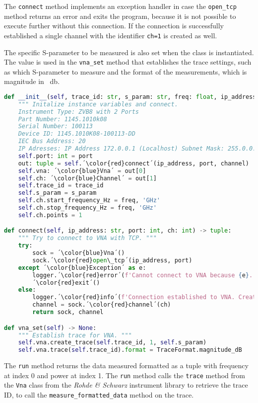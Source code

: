 The \verb+connect+ method implements an exception handler in case the \verb+open_tcp+ method returns an error and exits the program, because it is not possible to execute further without this connection. If the connection is successfully established a single channel with the identifier \verb+ch=1+ is created as well. 

The specific S-parameter to be measured is also set when the class is instantiated. The value is used in the \verb+vna_set+ method that establishes the trace settings, such as which S-parameter to measure and the format of the measurements, which is magnitude in \SI{}{\decibel}.

\begin{lstlisting}[language=Python, caption=Method for initialisation of VNA settings including creating VNA trace.]
def __init__(self, trace_id: str, s_param: str, freq: float, ip_address = '172.0.0.1', port: int = 5025, channel = 1) -> None:
    """ Initalize instance variables and connect.
    Instrument Type: ZVB8 with 2 Ports
    Part Number: 1145.1010k08
    Serial Number: 100113
    Device ID: 1145.1010K08-100113-DD
    IEC Bus Address: 20
    IP Adresses: IP Address 172.0.0.1 (Localhost) Subnet Mask: 255.0.0.0 """
    self.port: int = port
    out: tuple = self.´\color{red}connect´(ip_address, port, channel)
    self.vna: ´\color{blue}Vna´ = out[0]
    self.ch: ´\color{blue}Channel´ = out[1]
    self.trace_id = trace_id
    self.s_param = s_param
    self.ch.start_frequency_Hz = freq, 'GHz'
    self.ch.stop_frequency_Hz = freq, 'GHz'
    self.ch.points = 1

def connect(self, ip_address: str, port: int, ch: int) -> tuple:
    """ Try to connect to VNA with TCP. """
    try:
        sock = ´\color{blue}Vna´()
        sock.´\color{red}open\_tcp´(ip_address, port)
    except ´\color{blue}Exception´ as e:
        logger.´\color{red}error´(f'Cannot connect to VNA because {e}.')
        ´\color{red}exit´()
    else:
        logger.´\color{red}info´(f'Connection established to VNA. Creating channel {ch}.')
        channel = sock.´\color{red}channel´(ch)
        return sock, channel

def vna_set(self) -> None:
    """ Establish trace for VNA. """
    self.vna.create_trace(self.trace_id, 1, self.s_param)
    self.vna.trace(self.trace_id).format = TraceFormat.magnitude_dB
\end{lstlisting}

The \verb+run+ method returns the data measured formatted as a tuple with frequency at index 0 and power at index 1. The \verb+run+ method calls the \verb+trace+ method from the \verb+Vna+ class from the \textit{Rohde \& Schwarz} instrument library to retrieve the trace ID, to call the \verb+measure_formatted_data+ method on the trace. 

